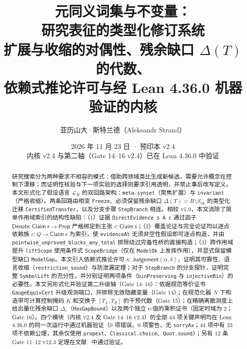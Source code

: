 \documentclass[11pt,a4paper,UTF8,fontset=fandol]{ctexart}
\title{\textbf{元同义词集与不变量：\\研究表征的类型化修订系统}\\[.6em]
\large 扩展与收缩的对偶性、残余缺口 $\Delta(T)$ 的代数、\\
依赖式推论许可与经 Lean 4.36.0 机器验证的内核}
\author{亚历山大·斯特兰德（Aleksandr Strand）}
\date{2026 年 11 月 23 日 · 预印本 v2.4\\
内核 v2.4 与第二轴（Gate 14–16 v2.4）已在 Lean 4.36.0 中验证}
\DeclareRobustCommand{\id}[1]{\nolinkurl{#1}}
\newcommand{\Sok}{S_{\mathrm{ok}}}
\newcommand{\Denote}{\mathsf{Denote}}
\begin{document}
\maketitle
\begin{abstract}
研究搜索分为两种要求不相容的模式：借助跨领域类比生成新候选，需要允许概念在控制下漂移；而证明性核验与下一项实验的选择则要求引用透明，并禁止事后改写定义。本文形式化了假设语言 $\mathcal L_H$ 的双回路架构：\id{meta-synset}（聚焦扩展）与 \id{invariant}（严格收缩）。两条回路由相变 \id{Freeze}、必须保留残余缺口 $\Delta(T)=R\setminus \Sok$ 的类型化迁移 \id{CertifiedTransfer}，以及分支步骤 \id{StepBranch} 相连。相较 v1.0，本文消除了简单作用域索引的结构性缺陷：（1）证据 \id{DirectEvidence s A c} 通过函子 $\Denote:\mathsf{Claim}\,s\to\mathsf{Prop}$ 严格绑定到主张 $c:\mathsf{Claim}\,s$；（2）覆盖论证与完全论证均以逐点依赖族 $c:Q\to\mathsf{Claim}\,s$ 为索引，使 \id{evidenceAt} 无须非空性假设即可逐点构造，并由 \id{pointwise_unproved_blocks_any_total} 排除绕过完备性桥的直接构造；（3）跨作用域提升 \id{liftScope} 使用条件式 \id{ScopeBridge}（仅在 \id{ModelOk} 上发挥作用），并显式保留模型缺口 \id{ModelGap}。本文引入依赖式推论许可 $\kappa:\mathsf{Judgement}(\alpha,\delta)$，证明其可靠性、语言收缩（\id{restriction_sound}）与防泄漏定理；对于 \id{StepBranch} 的分支探针，证明完整 \id{SymbolLift} 的充分性，并分别证明两项条件（\id{binPreserving} 与 \id{injectiveBin}）的必要性。本文另形式化并验证第二升级轴（Gate 14–16）：依据规范等价证书 \id{GaugeEquivCert} 升级观测端口，并排除无效隐藏变量（Gate 14）；在规范化器 $N$ 下构造带可计算控制掩码 $K$ 和交换子 $[T_L,T_R]$ 的干预代数（Gate 15）；在精确离散测度上给出量化残余缺口 $\Delta_\varepsilon$（\id{HasGapBound}）以及两个独立 e-值的乘积证书（固定时域为 2；Gate 16）。四个模块（内核 v2.4 及 Gate 14–16 v2.4）的全部 44 项关键声明均在 Lean 4.36.0 的同一次运行中通过机器验证（0 项错误、0 项警告、无 \id{sorryAx}；44 项中有 23 项不依赖公理，其余仅使用 \id{propext}、\id{Classical.choice}、\id{Quot.sound}）；另有 12 条 Gate 11–12 v12.3 定理在文献~\cite{g1112} 中通过验证。
\end{abstract}
\end{document}
